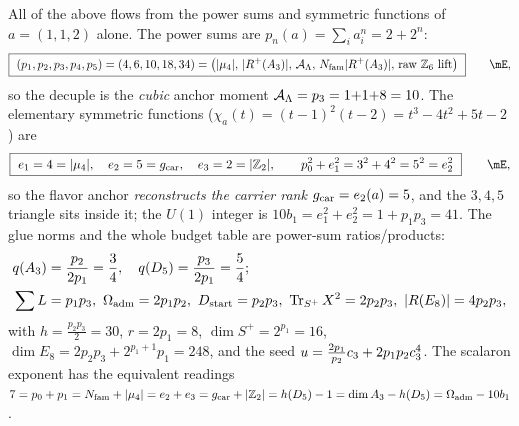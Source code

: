 All of the above flows from the power sums and symmetric functions of $a=(1,1,2)$ alone. The power
sums are $p_n(a)=\sum_i a_i^n=2+2^n$:
\begin{equation}
  \boxed{\ (p_1,p_2,p_3,p_4,p_5)=(4,6,10,18,34)=\bigl(|\mu_4|,\,|R^+(A_3)|,\,\AL,\,\Nfam|R^+(A_3)|,\,\text{raw }\mathbb Z_6\text{ lift}\bigr)\ }\qquad\mE ,
\end{equation}
so the decuple is the \emph{cubic} anchor moment $\mathcal A_\Lambda=p_3=1{+}1{+}8=10$. The elementary symmetric
functions ($\chi_a(t)=(t-1)^2(t-2)=t^3-4t^2+5t-2$) are
\begin{equation}
  \boxed{\ e_1=4=|\mu_4|,\quad e_2=5=\gcar,\quad e_3=2=|\mathbb Z_2|,\qquad p_0^2+e_1^2=3^2+4^2=5^2=e_2^2\ }\qquad\mE ,
\end{equation}
so the flavor anchor \emph{reconstructs the carrier rank} $g_{\mathrm{car}}=e_2(a)=5$, and the $3,4,5$ triangle
sits inside it; the $U(1)$ integer is $10b_1=e_1^2+e_2^2=1+p_1p_3=41$. The glue norms and the whole
budget table are power-sum ratios/products:
\begin{equation}
\begin{aligned}
  &q(A_3)=\frac{p_2}{2p_1}=\frac34,\quad q(D_5)=\frac{p_3}{2p_1}=\frac54;\\
  &\sum L=p_1p_3,\ \Oadm=2p_1p_2,\ \Dstart=p_2p_3,\ \operatorname{Tr}_{S^+}X^2=2p_2p_3,\ |R(E_8)|=4p_2p_3,
\end{aligned}
\end{equation}
with $h=\tfrac{p_2p_3}{2}=30$, $r=2p_1=8$, $\dim S^+=2^{p_1}=16$, $\dim E_8=2p_2p_3+2^{p_1+1}p_1=248$,
and the seed $u=\tfrac{2p_1}{p_2}c_3+2p_1p_2c_3^4$. The scalaron exponent has the equivalent
readings $7=p_0+p_1=N_{\mathrm{fam}}+|\mu_4|=e_2+e_3=g_{\mathrm{car}}+|\mathbb Z_2|=h(D_5)-1=\dim A_3-h(D_5)=\Omega_{\mathrm{adm}}-10b_1$. \mE

